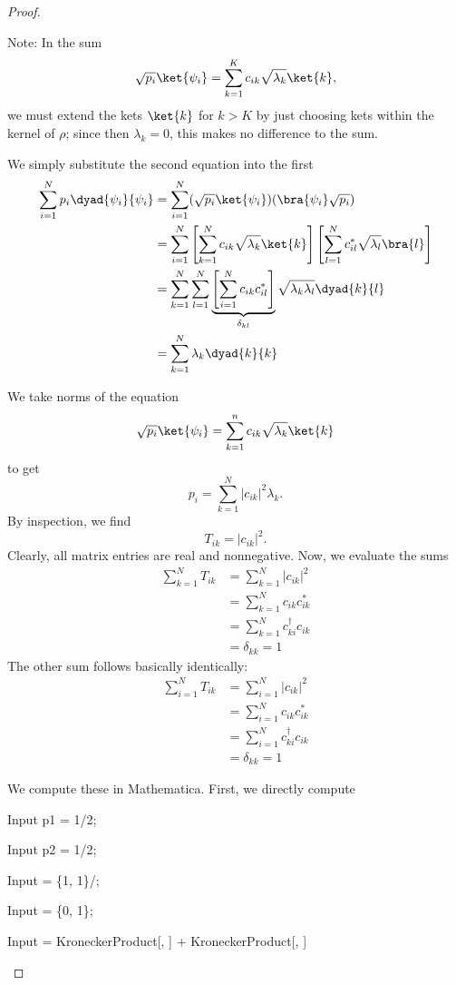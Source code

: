 \begin{proof}
\begin{parts}
		Note: In the sum
		\[
			\sqrt{p_i}\ket{\psi_i} = \sum_{k=1}^K c_{ik}\sqrt{\lambda_k} \ket{k}
		,\]
		we must extend the kets $\ket{k}$ for $k>K$ by just choosing kets within the kernel of $\rho$; since then $\lambda_k=0$, this makes no difference to the sum.
	\item We simply substitute the second equation into the first
		\begin{align*}
			\sum_{i=1}^N p_i \dyad{\psi_i}{\psi_i} &= \sum_{i=1}^N (\sqrt{p_i} \ket{\psi_i})(\bra{\psi_i} \sqrt{p_i} ) \\
							       &= \sum_{i=1}^N \left[ \sum_{k=1}^N c_{ik}\sqrt{\lambda_k} \ket{k} \right]\left[ \sum_{l=1}^N c_{il}^* \sqrt{\lambda_l} \bra{l} \right]   \\
							       &= \sum_{k=1}^N \sum_{l=1}^N \underbrace{\left[ \sum_{i=1}^N c_{ik}c_{il}^* \right]}_{\delta_{kl}} \sqrt{\lambda_k\lambda_l} \dyad{k}{l} \\
							       &= \sum_{k=1}^N \lambda_k \dyad{k}{k} 
		\end{align*}
	\item We take norms of the equation
		\[
			\sqrt{p_i} \ket{\psi_i} = \sum_{k=1}^n c_{ik}\sqrt{\lambda_k}\ket{k} 
		\]
		to get
		\[
			p_i = \sum_{k=1}^N |c_{ik}|^2 \lambda_k
		.\] 
		By inspection, we find
		\[
			T_{ik} = |c_{ik}|^2
		.\] 
		Clearly, all matrix entries are real and nonnegative. Now, we evaluate the sums
		\begin{align*}
			\sum_{k=1}^N T_{ik} &= \sum_{k=1}^N |c_{ik}|^2 \\
					    &= \sum_{k=1}^N c_{ik}c_{ik}^* \\
					    &= \sum_{k=1}^N c^\dagger_{ki}c_{ik} \\
					    &= \delta_{kk} = 1 
		\end{align*}
		The other sum follows basically identically:
		\begin{align*}
			\sum_{i=1}^N T_{ik} &= \sum_{i=1}^N |c_{ik}|^2 \\
					    &= \sum_{i=1}^N c_{ik}c_{ik}^* \\
					    &= \sum_{i=1}^N c^\dagger_{ki}c_{ik} \\
					    &= \delta_{kk}=1 
		\end{align*}
	\item We compute these in Mathematica. First, we directly compute
		\begin{mmaCell}{Input}
p1 = 1/2;
\end{mmaCell}
\begin{mmaCell}{Input}
p2 = 1/2;
\end{mmaCell}
\begin{mmaCell}{Input}
 = \{1, 1\}/;
\end{mmaCell}
\begin{mmaCell}{Input}
 = \{0, 1\};
\end{mmaCell}
\begin{mmaCell}{Input}
\mmaUnd{\(\rho\)} =  KroneckerProduct[, ] +  KroneckerProduct[, ]


\end{mmaCell}
\end{parts}
\end{proof}
